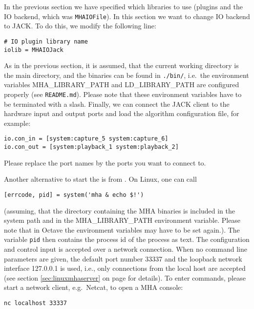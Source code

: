 In the previous section we have specified which libraries to use 
(plugins and the IO backend, which was \verb!MHAIOFile!). In this section 
we want to change IO backend to JACK. 
%
To do this, we modify the following line:
\begin{verbatim}
# IO plugin library name
iolib = MHAIOJack
\end{verbatim}
%
As in the previous section, it is assumed, that the current working directory is the main \mha{} directory, and the 
binaries can be found in \verb!./bin/!, i.e.\ the environment variables 
MHA\_LIBRARY\_PATH and LD\_LIBRARY\_PATH are configured
properly (see \verb!README.md!).
%
Please note that these environment variables have to be
terminated with a slash.
%
Finally, we can connect the JACK client to the hardware input and
output ports and load the algorithm configuration file, for example:
\begin{verbatim}
io.con_in = [system:capture_5 system:capture_6]
io.con_out = [system:playback_1 system:playback_2]
\end{verbatim}
Please replace the port names by the ports you want to connect
to.
%

Another alternative to start the \mhad{} is from \Matlab{}. On Linux, one can call
\begin{verbatim}
[errcode, pid] = system('mha & echo $!')
\end{verbatim}
(assuming, that the directory containing the MHA binaries is included
in the system path and in the MHA\_LIBRARY\_PATH environment
variable. Please note that in Octave the environment variables 
may have to be set again.).
%
The variable \verb!pid! then contains the process id of the \mhad{} process as text.
%
The \mha{} configuration and control
input is accepted over a network connection. 
%
When no command line parameters are given, the default port number
33337 and the loopback network interface 127.0.0.1 is used, i.e., only
connections from the local host are accepted (see section
\ref{sec:linuxmhaserver} on page \pageref{sec:linuxmhaserver} for
details).
%
To enter \mha{} commands, please start a network client, e.g.\ Netcat, to
open a MHA console:
\begin{verbatim}nc localhost 33337\end{verbatim}

